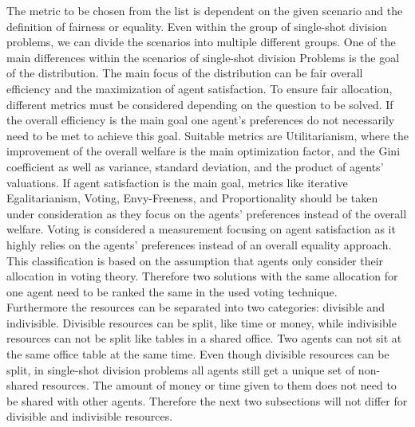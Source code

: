 \documentclass[german, a4paper, 11pt, oneside]{scrbook}
\begin{document}
The metric to be chosen from the list is dependent on the given scenario and the definition of fairness or equality. Even within the group of single-shot division problems, we can divide the scenarios into multiple different groups. One of the main differences within the scenarios of single-shot division Problems is the goal of the distribution. The main focus of the distribution can be fair overall efficiency and the maximization of agent satisfaction. To ensure fair allocation, different metrics must be considered depending on the question to be solved. If the overall efficiency is the main goal one agent's preferences do not necessarily need to be met to achieve this goal. Suitable metrics are Utilitarianism, where the improvement of the overall welfare is the main optimization factor, and the Gini coefficient as well as variance, standard deviation, and the product of agents' valuations. If agent satisfaction is the main goal, metrics like iterative Egalitarianism, Voting, Envy-Freeness, and Proportionality should be taken under consideration as they focus on the agents' preferences instead of the overall welfare. Voting is considered a measurement focusing on agent satisfaction as it highly relies on the agents' preferences instead of an overall equality approach. This classification is based on the assumption that agents only consider their allocation in voting theory. Therefore two solutions with the same allocation for one agent need to be ranked the same in the used voting technique.\\ Furthermore the resources can be separated into two categories: divisible and indivisible. \cite{Brandt} Divisible resources can be split, like time or money, while indivisible resources can not be split like tables in a shared office. Two agents can not sit at the same office table at the same time. Even though divisible resources can be split, in single-shot division problems all agents still get a unique set of non-shared resources. The amount of money or time given to them does not need to be shared with other agents. Therefore the next two subsections will not differ for divisible and indivisible resources.
\end{document}

